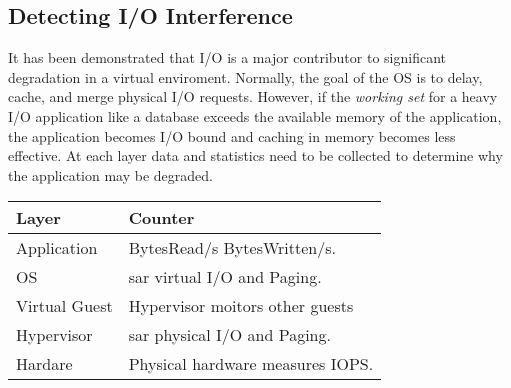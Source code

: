 \begin{comment}
       To see every process with a user-defined format:
          ps -eo pid,tid,class,rtprio,ni,pri,psr,pcpu,stat,wchan:14,comm
          ps axo stat,euid,ruid,tty,tpgid,sess,pgrp,ppid,pid,pcpu,comm
          ps -eo pid,tt,user,fname,tmout,f,wchan

PROCESS STATE CODES
       Here are the different values that the s, stat and state output
       specifiers (header "STAT" or "S") will display to describe the state of
       a process:
       D    uninterruptible sleep (usually IO)
       R    running or runnable (on run queue)
       S    interruptible sleep (waiting for an event to complete)
       T    stopped, either by a job control signal or because it is being
            traced.
       W    paging (not valid since the 2.6.xx kernel)
       X    dead (should never be seen)
       Z    defunct ("zombie") process, terminated but not reaped by its
            parent.
      For BSD formats and when the stat keyword is used, additional
       characters may be displayed:
       <    high-priority (not nice to other users)
       N    low-priority (nice to other users)
       L    has pages locked into memory (for real-time and custom IO)
       s    is a session leader
       l    is multi-threaded (using CLONE_THREAD, like NPTL pthreads do)
       +    is in the foreground process group.
\end{comment}

\subsection{Detecting I/O Interference}
It has been demonstrated that I/O is a major contributor to significant degradation in a virtual enviroment.  Normally, the goal of the OS is to delay, cache, and merge physical I/O requests.  However, if the \emph{working set} for a heavy I/O application like a database exceeds the available memory of the application, the application becomes I/O bound and caching in memory becomes less effective.
At each layer data and statistics need to be collected to determine why the application may be degraded.
\newline

\begin{tabular}{ l p{5cm} }
  Layer & Counter \\
  \hline
  Application & BytesRead/s BytesWritten/s. \\
  OS & sar virtual I/O and Paging. \\
  Virtual Guest & Hypervisor moitors other guests \\
  Hypervisor & sar physical I/O and Paging. \\
  Hardare & Physical hardware measures IOPS. \\
\end{tabular}

